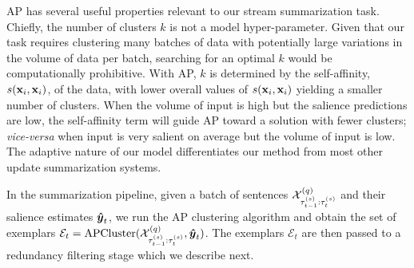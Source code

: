  

AP has several useful properties relevant to our stream summarization task. Chiefly, the number
of clusters $k$ is not a model hyper-parameter. Given that our task requires
clustering many batches of data with potentially large variations in the volume of data per batch, searching for an optimal $k$ 
would be computationally prohibitive. With AP, $k$ is determined by the 
self-affinity,
$s(\mathbf{x}_i,\mathbf{x}_i)$, of the data,  with lower overall values of $s(\mathbf{x}_i,\mathbf{x}_i)$ yielding a 
smaller number of clusters.
When the volume of input is high but the
salience predictions are low, the self-affinity term will guide AP toward a
solution with fewer clusters; \textit{vice-versa} when input is very salient
on average but the volume of input is low. The adaptive nature of our model
differentiates our method from most other update summarization systems.

In the summarization pipeline, given a batch of sentences
$\mathcal{X}^{(q)}_{\tau^{(s)}_{t-1}:\tau^{(s)}_t}$ and their salience
estimates $\boldsymbol{\hat{y}}_t$, we run the AP clustering algorithm and obtain the
set of exemplars $\mathcal{E}_t =
\operatorname{APCluster}(\mathcal{X}^{(q)}_{\tau^{(s)}_{t-1}:\tau^{(s)}_t},
\boldsymbol{\hat{y}}_t)$. The exemplars $\mathcal{E}_t$ are then passed to a redundancy
filtering stage which we describe next.

